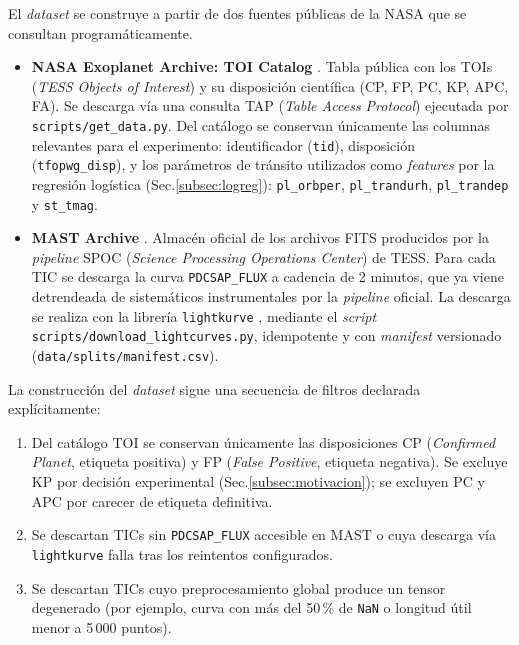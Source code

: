 \documentclass[11pt,a4paper]{article}
\begin{document}
El \textit{dataset} se construye a partir de dos fuentes públicas de la NASA
que se consultan programáticamente.

\begin{itemize}
  \item \textbf{NASA Exoplanet Archive: TOI Catalog}
    \cite{nasaExoplanetArchiveTOI}. Tabla pública con los TOIs
    (\textit{TESS Objects of Interest}) y su disposición científica
    (CP, FP, PC, KP, APC, FA). Se descarga vía una consulta TAP
    (\textit{Table Access Protocol}) ejecutada por
    \texttt{scripts/get\_data.py}. Del catálogo se conservan únicamente
    las columnas relevantes para el experimento: identificador
    (\texttt{tid}), disposición (\texttt{tfopwg\_disp}), y los parámetros
    de tránsito utilizados como \textit{features} por la regresión
    logística (Sec.\ref{subsec:logreg}): \texttt{pl\_orbper},
    \texttt{pl\_trandurh}, \texttt{pl\_trandep} y \texttt{st\_tmag}.
  \item \textbf{MAST Archive} \cite{mastTessProducts}. Almacén oficial
    de los archivos FITS producidos por la \textit{pipeline} SPOC
    (\textit{Science Processing Operations Center}) de TESS. Para cada
    TIC se descarga la curva \texttt{PDCSAP\_FLUX} a cadencia de 2
    minutos, que ya viene detrendeada de sistemáticos instrumentales
    por la \textit{pipeline} oficial. La descarga se realiza con la
    librería \texttt{lightkurve} \cite{lightkurve}, mediante el
    \textit{script} \texttt{scripts/download\_lightcurves.py},
    idempotente y con \textit{manifest} versionado
    (\texttt{data/splits/manifest.csv}).
\end{itemize}

La construcción del \textit{dataset} sigue una secuencia de filtros
declarada explícitamente:

\begin{enumerate}
  \item Del catálogo TOI se conservan únicamente las disposiciones
    CP (\textit{Confirmed Planet}, etiqueta positiva) y FP
    (\textit{False Positive}, etiqueta negativa). Se excluye KP por
    decisión experimental (Sec.\ref{subsec:motivacion}); se excluyen
    PC y APC por carecer de etiqueta definitiva.
  \item Se descartan TICs sin \texttt{PDCSAP\_FLUX} accesible en MAST
    o cuya descarga vía \texttt{lightkurve} falla tras los reintentos
    configurados.
  \item Se descartan TICs cuyo preprocesamiento global produce un
    tensor degenerado (por ejemplo, curva con más del 50\,\% de
    \texttt{NaN} o longitud útil menor a 5\,000 puntos).
\end{enumerate}
\end{document}
